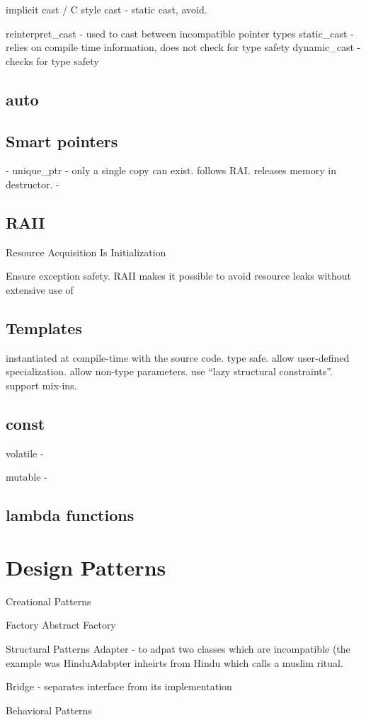 implicit cast / C style cast - static cast, avoid.

reinterpret_cast -  used to cast between incompatible pointer types
static_cast - relies on compile time information, does not check for type safety
dynamic_cast - checks for type safety

\subsection{auto}

\subsection{Smart pointers}
 - unique_ptr - only a single copy can exist. follows RAI. releases memory in destructor.
 - 

\subsection{RAII}
Resource Acquisition Is Initialization

Ensure exception safety. 
RAII makes it possible to avoid resource leaks without extensive use of

\subsection{Templates}

instantiated at compile-time with the source code.
type safe.
allow user-defined specialization.
allow non-type parameters.
use “lazy structural constraints”.
support mix-ins.

\subsection{const}

volatile - 

mutable - 

\subsection{lambda functions}


\section{Design Patterns}

Creational Patterns

Factory
Abstract Factory

Structural Patterns
Adapter - to adpat two classes which are incompatible (the example was HinduAdabpter inheirts from Hindu which calls a muslim ritual.

Bridge - separates interface from its implementation

Behavioral Patterns

